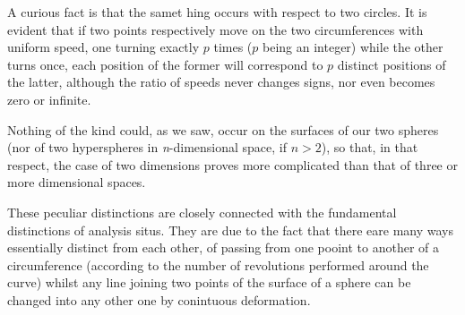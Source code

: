 \documentclass[12pt,oneside]{book}
\begin{document}

A curious fact is that the samet hing occurs with respect to two circles. It is evident that if two points respectively move on the two circumferences with uniform speed, one turning exactly $p$ times ($p$ being an integer) while the other turns once, each position of the former will correspond to $p$ distinct positions of the latter, although the ratio of speeds never changes signs, nor even becomes zero or infinite. \par 

Nothing of the kind could, as we saw, occur on the surfaces of our two spheres (nor of two hyperspheres in \textit{n}-dimensional space, if $n>2$), so that, in that respect, the case of two dimensions proves more complicated than that of three or more dimensional spaces. \par 

These peculiar distinctions are closely connected with the fundamental distinctions of analysis situs. They are due to the fact that there eare many ways essentially distinct from each other, of passing from one pooint to another of a circumference (according to the number of revolutions performed around the curve) whilst any line joining two points of the surface of a sphere can be changed into any other one by conintuous deformation. \par 
\end{document}
